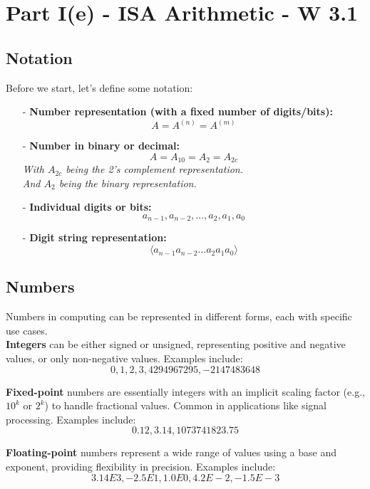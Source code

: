 \chapter{Part I(e) - ISA Arithmetic - W 3.1}
\section{Notation}
Before we start, let's define some notation:
\begin{itemize}
    \item[-] \textbf{Number representation (with a fixed number of digits/bits):}
    \[
    A = A^{(n)} = A^{(m)}
    \]
    
    \item[-] \textbf{Number in binary or decimal:}
    \[
    A = A_{10} = A_{2} = A_{2c}
    \]
    \textit{With $A_{2c}$ being the 2's complement representation.} \\
    \textit{And $A_{2}$ being the binary representation.}
    \item[-] \textbf{Individual digits or bits:}
    \[
    a_{n-1}, a_{n-2}, \dots, a_2, a_1, a_0
    \]
    
    \item[-] \textbf{Digit string representation:}
    \[
    \langle a_{n-1} a_{n-2} \dots a_2 a_1 a_0 \rangle
    \]
\end{itemize}

\section{Numbers}

Numbers in computing can be represented in different forms, each with specific use cases. \\
\vspace*{5px}
\textbf{Integers} can be either signed or unsigned, representing positive and negative values, or only non-negative values. Examples include:
\[
0, 1, 2, 3, 4294967295, -2147483648
\]

\textbf{Fixed-point} numbers are essentially integers with an implicit scaling factor (e.g., \(10^k\) or \(2^k\)) to handle fractional values. Common in applications like signal processing. Examples include:
\[
0.12, 3.14, 1073741823.75
\]

\textbf{Floating-point} numbers represent a wide range of values using a base and exponent, providing flexibility in precision. Examples include:
\[
3.14E3, -2.5E1, 1.0E0, 4.2E-2, -1.5E-3
\]

